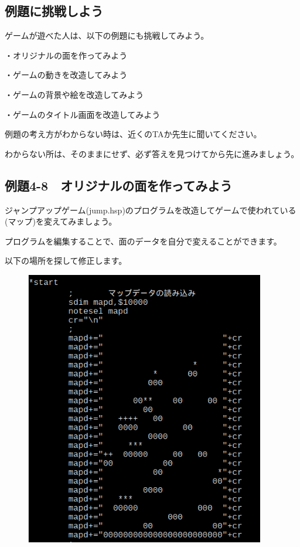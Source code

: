 \newpage
\subsection{例題に挑戦しよう}

ゲームが遊べた人は、以下の例題にも挑戦してみよう。

・オリジナルの面を作ってみよう

・ゲームの動きを改造してみよう

・ゲームの背景や絵を改造してみよう

・ゲームのタイトル画面を改造してみよう

例題の考え方がわからない時は、近くのTAか先生に聞いてください。

わからない所は、そのままにせず、必ず答えを見つけてから先に進みましょう。

\newpage
\subsection{例題4-8　オリジナルの面を作ってみよう}


\begin{description}
    \item {}
\end{description}

ジャンプアップゲーム(jump.hsp)のプログラムを改造してゲームで使われている(マップ)を変えてみましょう。

プログラムを編集することで、面のデータを自分で変えることができます。

以下の場所を探して修正します。


\begin{figure}[H]
    \begin{center}
      \includegraphics[keepaspectratio,width=10.478cm,height=12.07cm]{text04-img/s_jumpmapsrc.png}
    \end{center}
    \label{fig:prog_menu}
\end{figure}



